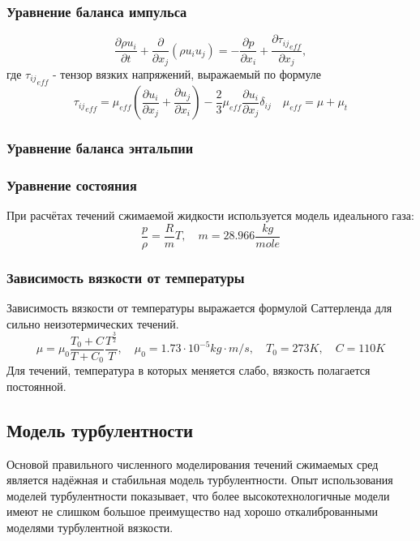 \documentclass[pdftex,a4paper,12pt]{article}
\begin{document}
		\subsubsection{Уравнение баланса импульса}
			\begin{equation}
				\frac{\partial \rho u_i}{\partial t} + \frac{\partial}{\partial x_j}(\rho u_iu_j) = - \frac{\partial p}{\partial x_i} + \frac{\partial {\tau_{ij}}_{eff}}{\partial x_j},
			\end{equation}
			где ${\tau_{ij}}_{eff}$ - тензор вязких напряжений, выражаемый по формуле
			\begin{equation}
				{\tau_{ij}}_{eff} = \mu_{eff}\left( \frac{\partial u_i}{\partial x_j} + \frac{\partial u_j}{\partial x_i} \right) - \frac{2}{3}\mu_{eff}\frac{\partial u_i}{\partial x_j} \delta_{ij} \quad \mu_{eff} = \mu + \mu_{t}
			\end{equation}
		\subsubsection{Уравнение баланса энтальпии}
		\subsubsection{Уравнение состояния}
			\hspace{2em}При расчётах течений сжимаемой жидкости используется модель идеального газа:
			\begin{equation}
				\frac{p}{\rho} = \frac{R}{m}T, \quad m = 28.966 \frac{kg}{mole}
			\end{equation}
			\subsubsection{Зависимость вязкости от температуры}
				\hspace{2em}Зависимость вязкости от температуры выражается формулой Саттерленда для сильно неизотермических течений.
				\begin{equation}
					\mu = \mu_0 \frac{T_0 + C}{T + C_0} \frac{T^{\frac{3}{2}}}{T}, \quad \mu_0 = 1.73 \cdot 10^{-5} kg \cdot m/s, \quad T_0 = 273K, \quad C=110 K
				\end{equation}
				Для течений, температура в которых меняется слабо, вязкость полагается постоянной.
	\newpage
	\subsection{Модель турбулентности}
		\hspace{2em}
		Основой правильного численного моделирования течений сжимаемых сред является надёжная и стабильная модель турбулентности. Опыт использования моделей турбулентности показывает, что более высокотехнологичные модели имеют не слишком большое преимущество над хорошо откалиброванными моделями турбулентной вязкости.
		
\end{document}
